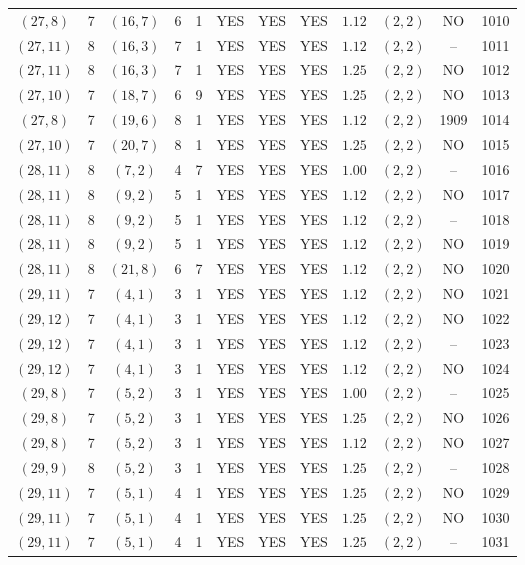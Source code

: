 \begin{longtable}{|c|c|c|c|c|c|c|c|c|c|c|c|}
$(27,8)$ & 7 & $(16,7)$ & 6 & 1 & YES & YES & YES & $1.12$ & $(2,2)$ & NO & 1010\\
$(27,11)$ & 8 & $(16,3)$ & 7 & 1 & YES & YES & YES & $1.12$ & $(2,2)$ & -- & 1011\\
$(27,11)$ & 8 & $(16,3)$ & 7 & 1 & YES & YES & YES & $1.25$ & $(2,2)$ & NO & 1012\\
$(27,10)$ & 7 & $(18,7)$ & 6 & 9 & YES & YES & YES & $1.25$ & $(2,2)$ & NO & 1013\\
$(27,8)$ & 7 & $(19,6)$ & 8 & 1 & YES & YES & YES & $1.12$ & $(2,2)$ & 1909 & 1014\\
$(27,10)$ & 7 & $(20,7)$ & 8 & 1 & YES & YES & YES & $1.25$ & $(2,2)$ & NO & 1015\\
$(28,11)$ & 8 & $(7,2)$ & 4 & 7 & YES & YES & YES & $1.00$ & $(2,2)$ & -- & 1016\\
$(28,11)$ & 8 & $(9,2)$ & 5 & 1 & YES & YES & YES & $1.12$ & $(2,2)$ & NO & 1017\\
$(28,11)$ & 8 & $(9,2)$ & 5 & 1 & YES & YES & YES & $1.12$ & $(2,2)$ & -- & 1018\\
$(28,11)$ & 8 & $(9,2)$ & 5 & 1 & YES & YES & YES & $1.12$ & $(2,2)$ & NO & 1019\\
$(28,11)$ & 8 & $(21,8)$ & 6 & 7 & YES & YES & YES & $1.12$ & $(2,2)$ & NO & 1020\\
$(29,11)$ & 7 & $(4,1)$ & 3 & 1 & YES & YES & YES & $1.12$ & $(2,2)$ & NO & 1021\\
$(29,12)$ & 7 & $(4,1)$ & 3 & 1 & YES & YES & YES & $1.12$ & $(2,2)$ & NO & 1022\\
$(29,12)$ & 7 & $(4,1)$ & 3 & 1 & YES & YES & YES & $1.12$ & $(2,2)$ & -- & 1023\\
$(29,12)$ & 7 & $(4,1)$ & 3 & 1 & YES & YES & YES & $1.12$ & $(2,2)$ & NO & 1024\\
$(29,8)$ & 7 & $(5,2)$ & 3 & 1 & YES & YES & YES & $1.00$ & $(2,2)$ & -- & 1025\\
$(29,8)$ & 7 & $(5,2)$ & 3 & 1 & YES & YES & YES & $1.25$ & $(2,2)$ & NO & 1026\\
$(29,8)$ & 7 & $(5,2)$ & 3 & 1 & YES & YES & YES & $1.12$ & $(2,2)$ & NO & 1027\\
$(29,9)$ & 8 & $(5,2)$ & 3 & 1 & YES & YES & YES & $1.25$ & $(2,2)$ & -- & 1028\\
$(29,11)$ & 7 & $(5,1)$ & 4 & 1 & YES & YES & YES & $1.25$ & $(2,2)$ & NO & 1029\\
$(29,11)$ & 7 & $(5,1)$ & 4 & 1 & YES & YES & YES & $1.25$ & $(2,2)$ & NO & 1030\\
$(29,11)$ & 7 & $(5,1)$ & 4 & 1 & YES & YES & YES & $1.25$ & $(2,2)$ & -- & 1031\\

\end{longtable}
